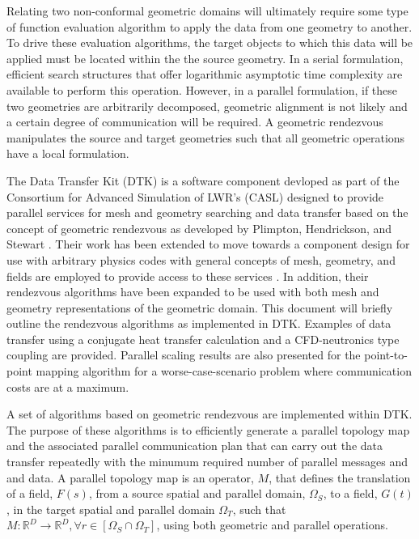 \documentclass{mc2013}
\begin{document}
Relating two non-conformal geometric domains will ultimately require
some type of function evaluation algorithm to apply the data from one
geometry to another. To drive these evaluation algorithms, the target
objects to which this data will be applied must be located within the
the source geometry. In a serial formulation, efficient search
structures that offer logarithmic asymptotic time complexity are
available to perform this operation. However, in a parallel
formulation, if these two geometries are arbitrarily decomposed,
geometric alignment is not likely and a certain degree of
communication will be required. A geometric rendezvous manipulates the
source and target geometries such that all geometric operations have a
local formulation.

The Data Transfer Kit (DTK) is a software component devloped as part
of the Consortium for Advanced Simulation of LWR's (CASL)
\cite{u.s._department_of_energy_casl_2011} designed to provide
parallel services for mesh and geometry searching and data transfer
based on the concept of geometric rendezvous as developed by Plimpton,
Hendrickson, and Stewart \cite{Plimpton_2004}. Their work has been
extended to move towards a component design for use with arbitrary
physics codes with general concepts of mesh, geometry, and fields are
employed to provide access to these services \cite{Chand_2008}. In
addition, their rendezvous algorithms have been expanded to be used
with both mesh and geometry representations of the geometric
domain. This document will briefly outline the rendezvous algorithms
as implemented in DTK. Examples of data transfer using a conjugate
heat transfer calculation and a CFD-neutronics type coupling are
provided. Parallel scaling results are also presented for the
point-to-point mapping algorithm for a worse-case-scenario problem
where communication costs are at a maximum.


\label{sec:rendezvous_algorithms}

A set of algorithms based on geometric rendezvous are implemented
within DTK. The purpose of these algorithms is to efficiently generate
a parallel topology map and the associated parallel communication plan
that can carry out the data transfer repeatedly with the minumum
required number of parallel messages and and data. A parallel topology
map is an operator, $M$, that defines the translation of a field,
$F(s)$, from a source spatial and parallel domain, $\Omega_S$, to a
field, $G(t)$, in the target spatial and parallel domain $\Omega_T$,
such that $M: \mathbb{R}^D \rightarrow \mathbb{R}^D, \forall r \in
[\Omega_S \cap \Omega_T]$, using both geometric and parallel
operations.
\end{document}
